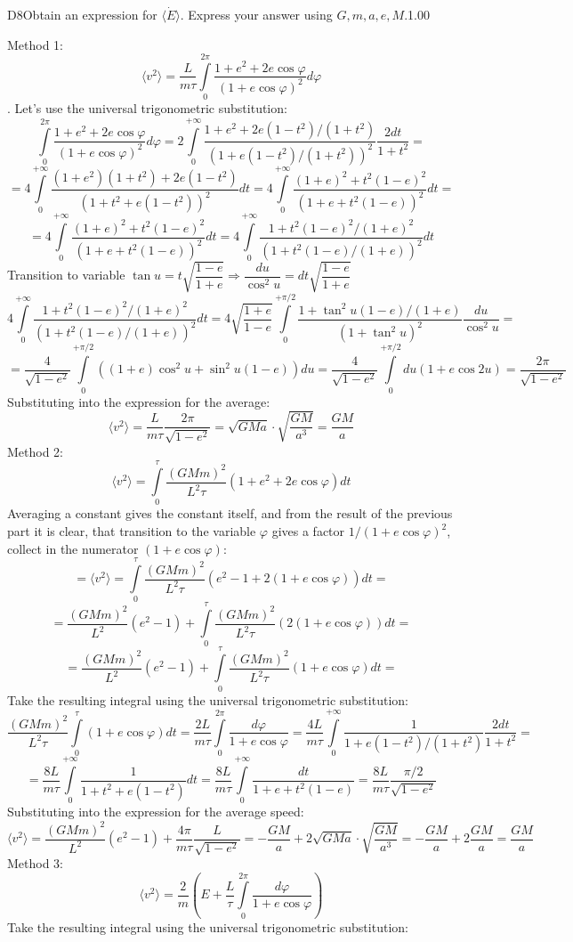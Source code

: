 \documentclass[11pt,a4paper]{article}
\begin{document}
\begin{solcard}{D8}{Obtain an expression for $ \langle\dot E\rangle $. Express your answer using $G, m, a, e, M$.}{1.00}

Method 1: $$\langle v^2 \rangle= \dfrac{L}{m\tau} \int\limits_{0}^{2\pi}\dfrac{1+e^2+2e\cos{\varphi}}{(1+e\cos{\varphi})^2}d\varphi$$. Let's use the universal trigonometric substitution: $$\int\limits_{0}^{2\pi}\dfrac{1+e^2+2e\cos{\varphi}}{(1+e\cos{\varphi})^2}d\varphi=2\int\limits_{0}^{+\infty}\dfrac{1+e^2+2e(1-t^2)/(1+t^2)}{(1+e(1-t^2)/(1+t^2))^2}\dfrac{2dt}{1+t^2}=$$ $$=4\int\limits_{0}^{+\infty}\dfrac{(1+e^2)(1+t^2)+2e(1-t^2)}{(1+t^2+e(1-t^2))^2}dt=4\int\limits_{0}^{+\infty}\dfrac{(1+e)^2+t^2(1-e)^2}{(1+e+t^2(1-e))^2}dt=$$ $$=4\int\limits_{0}^{+\infty}\dfrac{(1+e)^2+t^2(1-e)^2}{(1+e+t^2(1-e))^2}dt=4\int\limits_{0}^{+\infty}\dfrac{1+t^2(1-e)^2/(1+e)^2}{(1+t^2(1-e)/(1+e))^2}dt$$ Transition to variable $\tan u=t\sqrt{\dfrac{1-e}{1+e}}\Rightarrow \dfrac{du}{\cos^2u}=dt\sqrt{\dfrac{1-e}{1+e}}$ $$4\int\limits_{0}^{+\infty}\dfrac{1+t^2(1-e)^2/(1+e)^2}{(1+t^2(1-e)/(1+e))^2}dt=4\sqrt{\dfrac{1+e}{1-e}}\int\limits_{0}^{+\pi/2}\dfrac{1+\tan^2u(1-e)/(1+e)}{(1+\tan^2u)^2}\dfrac{du}{\cos^2u}=$$ $$=\dfrac{4}{\sqrt{1-e^2}}\int\limits_{0}^{+\pi/2}((1+e)\cos^2u+\sin^2u(1-e))du=\dfrac{4}{\sqrt{1-e^2}}\int\limits_{0}^{+\pi/2}du(1+e\cos2u)=\dfrac{2\pi}{\sqrt{1-e^2}}$$ Substituting into the expression for the average: $$\langle v^2 \rangle= \dfrac{L}{m\tau} \dfrac{2\pi}{\sqrt{1-e^2}}=\sqrt{GMa}\cdot\sqrt{\dfrac{GM}{a^3}}=\dfrac{GM}{a}$$ Method 2: $$\langle v^2 \rangle=\int\limits_{0}^{\tau}\dfrac{(GMm)^2}{L^2\tau}(1+e^2+2e\cos{\varphi})dt$$ Averaging a constant gives the constant itself, and from the result of the previous part it is clear, that transition to the variable $\varphi$ gives a factor $1/(1+e\cos\varphi)^2 $, collect in the numerator $(1+e\cos\varphi)$: $$=\langle v^2 \rangle=\int\limits_{0}^{\tau}\dfrac{(GMm)^2}{L^2\tau}(e^2-1+2(1+e\cos{\varphi}))dt=$$ $$=\dfrac{(GMm)^2}{L^2}(e^2-1)+ \int\limits_{0}^{\tau}\dfrac{(GMm)^2}{L^2\tau}(2(1+e\cos{\varphi}))dt=$$ $$=\dfrac{(GMm)^2}{L^2}(e^2-1)+\int\limits_{0}^{\tau}\dfrac{(GMm)^2}{L^2\tau}(1+e\cos{\varphi})dt=$$ Take the resulting integral using the universal trigonometric substitution: $$\dfrac{(GMm)^2}{L^2\tau}\int\limits_{0}^{\tau}(1+e\cos{\varphi})dt=\dfrac{2L}{m\tau}\int\limits_{0}^{2\pi}\dfrac{d\varphi}{1+e\cos{\varphi}}=\dfrac{4L}{m\tau}\int\limits_{0}^{+\infty}\dfrac{1}{1+e(1-t^2)/(1+t^2)}\dfrac{2dt}{1+t^2}=$$ $$=\dfrac{8L}{m\tau}\int\limits_{0}^{+\infty}\dfrac{1}{1+t^2+e(1-t^2)}dt=\dfrac{8L}{m\tau}\int\limits_{0}^{+\infty}\dfrac{dt}{1+e+t^2(1-e)}=\dfrac{8L}{m\tau}\dfrac{\pi/2}{\sqrt{1-e^2}}$$ Substituting into the expression for the average speed: $$\langle v^2 \rangle= \dfrac{(GMm)^2}{L^2}(e^2-1)+\dfrac{4\pi}{m\tau}\dfrac{L}{\sqrt{1-e^2}}=-\dfrac{GM}{a}+2\sqrt{GMa}\cdot \sqrt{\dfrac{GM}{a^3}}=-\dfrac{GM}{a}+2\dfrac{GM}{a}=\dfrac{GM}{a}$$ Method 3: $$\langle v^2 \rangle=\dfrac{2}{m}\left(E+\dfrac{L}{\tau}\int\limits_{0}^{2\pi}\dfrac{d\varphi}{1+e\cos{\varphi}}\right)$$ Take the resulting integral using the universal trigonometric substitution: 
\end{solcard}
\end{document}
